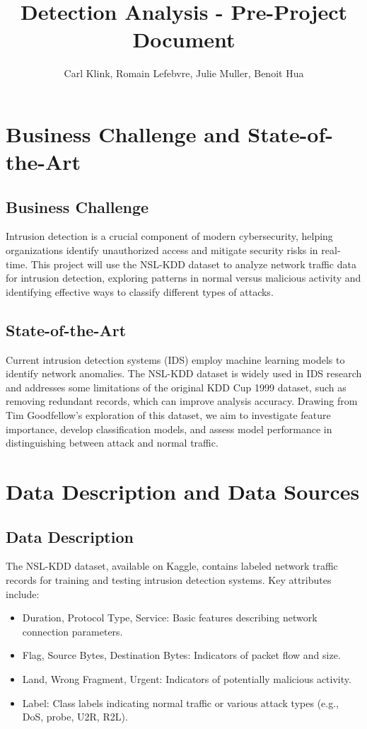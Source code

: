\documentclass[a4paper,12pt]{article}
\title{Detection Analysis - Pre-Project Document}
\author{Carl Klink, Romain Lefebvre, Julie Muller, Benoit Hua}
\date{}
\begin{document}
\maketitle

\section{Business Challenge and State-of-the-Art}

\subsection{Business Challenge}
Intrusion detection is a crucial component of modern cybersecurity, helping organizations identify unauthorized access and mitigate security risks in real-time. This project will use the NSL-KDD dataset to analyze network traffic data for intrusion detection, exploring patterns in normal versus malicious activity and identifying effective ways to classify different types of attacks.

\subsection{State-of-the-Art}
Current intrusion detection systems (IDS) employ machine learning models to identify network anomalies. The NSL-KDD dataset is widely used in IDS research and addresses some limitations of the original KDD Cup 1999 dataset, such as removing redundant records, which can improve analysis accuracy. Drawing from Tim Goodfellow’s exploration of this dataset, we aim to investigate feature importance, develop classification models, and assess model performance in distinguishing between attack and normal traffic.

\section{Data Description and Data Sources}

\subsection{Data Description}
The NSL-KDD dataset, available on Kaggle, contains labeled network traffic records for training and testing intrusion detection systems. Key attributes include:
\begin{itemize}
    \item Duration, Protocol Type, Service: Basic features describing network connection parameters.
    \item Flag, Source Bytes, Destination Bytes: Indicators of packet flow and size.
    \item Land, Wrong Fragment, Urgent: Indicators of potentially malicious activity.
    \item Label: Class labels indicating normal traffic or various attack types (e.g., DoS, probe, U2R, R2L).
\end{itemize}
\end{document}
